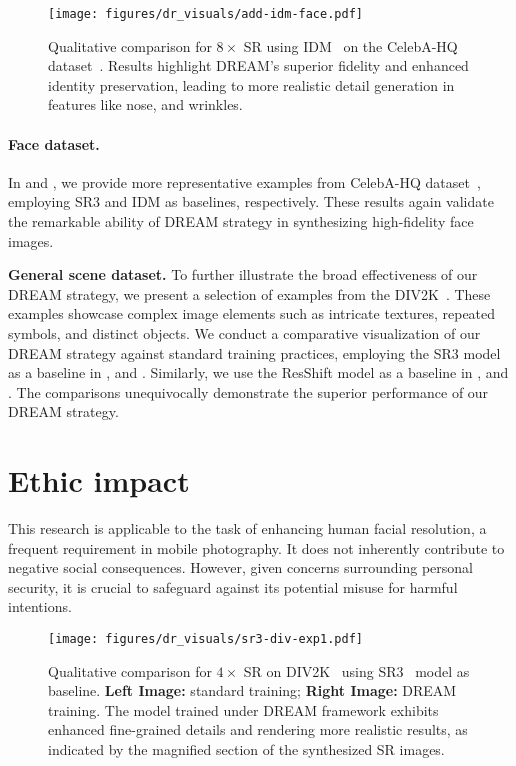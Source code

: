\begin{figure}[t]
    \centering
    \texttt{[image: figures/dr\_visuals/add-idm-face.pdf]}
    \vspace{-.1in}
    \caption{
    Qualitative comparison for $8\times$ SR using IDM~\cite{gao2023implicit} on the CelebA-HQ dataset~\cite{karras2017progressive}. Results highlight DREAM's superior fidelity and enhanced identity preservation, leading to more realistic detail generation in features like nose, and wrinkles.} 
        \label{fig:app-face-idm}
    \vspace{-.2in}
\end{figure}

\paragraph{Face dataset.} In  and  , we provide more representative examples from CelebA-HQ dataset~\cite{karras2017progressive}, employing SR3 and IDM as baselines, respectively. These results again
validate the remarkable ability of DREAM strategy in synthesizing high-fidelity face images. 

\noindent\textbf{General scene dataset.} To further illustrate the broad effectiveness of our DREAM  strategy, we present a selection of examples from the DIV2K~\cite{agustsson2017ntire}. These examples showcase complex image elements such as intricate textures, repeated symbols, and distinct objects. We conduct a comparative visualization of our DREAM strategy against standard training practices, employing the SR3 model as a baseline in ,  and . Similarly, we use the ResShift model as a baseline in ,  and . The comparisons unequivocally demonstrate the superior performance of our DREAM strategy.  
\section{Ethic impact}
\label{sec:app-ethic}
This research is applicable to the task of enhancing human facial resolution, a frequent requirement in mobile photography. It does not inherently contribute to negative social consequences. However, given concerns surrounding personal security, it is crucial to safeguard against its potential misuse for harmful intentions.
\begin{figure*}[t]
    \centering
    \texttt{[image: figures/dr\_visuals/sr3-div-exp1.pdf]}
    \vspace{-.1in}
    \caption{
    Qualitative comparison for $4\times$ SR on DIV2K~\cite{agustsson2017ntire} using SR3~\cite{saharia2022image} model as baseline. \textbf{Left Image:} standard training; \textbf{Right Image:} DREAM training. The model trained under DREAM framework exhibits enhanced fine-grained details and rendering more realistic results, as indicated by the magnified section of the synthesized SR images.}
        \label{fig:sr3-div-exp1}
    \vspace{-.1in}
\end{figure*}

